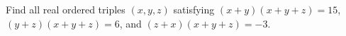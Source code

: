 Find all real ordered triples $(x,y,z)$ satisfying $(x+y)(x+y+z)=15$, $(y+z)(x+y+z)=6$, and $(z+x)(x+y+z)=-3$.
